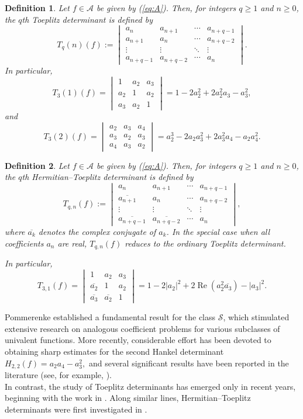 \documentclass[11pt, reqno]{amsart}
\newtheorem{defi}{Definition}[section]
\numberwithin{equation}{section}
\begin{document}
\begin{defi}
Let \(f\in\mathcal{A}\) be given by (\ref{eq:A}). Then, for integers $q\ge1$ and $n\ge0$, the \emph{$q$th Toeplitz determinant} is defined by
\[
T_q(n)(f):=
\begin{vmatrix}
a_n & a_{n+1} & \cdots & a_{n+q-1}\\
a_{n+1} & a_n & \cdots & a_{n+q-2}\\
\vdots & \vdots & \ddots & \vdots\\
a_{n+q-1} & a_{n+q-2} & \cdots & a_n
\end{vmatrix}.
\]
In particular,
\[
T_3(1)(f)
=
\begin{vmatrix}
1 & a_2 & a_3\\
a_2 & 1 & a_2\\
a_3 & a_2 & 1
\end{vmatrix}
=
1-2a_2^2+2a_2^2a_3-a_3^2,
\]
and
\[
T_3(2)(f)
=
\begin{vmatrix}
a_2 & a_3 & a_4\\
a_3 & a_2 & a_3\\
a_4 & a_3 & a_2
\end{vmatrix}
=
a_2^3-2a_2a_3^2+2a_3^2a_4-a_2a_4^2.
\]
\end{defi}

\begin{defi}
Let \(f\in\mathcal{A}\) be given by (\ref{eq:A}). Then, for integers $q\ge1$ and $n\ge0$, the \emph{$q$th Hermitian--Toeplitz determinant} is defined by
\[
T_{q,n}(f):=
\begin{vmatrix}
a_n & a_{n+1} & \cdots & a_{n+q-1}\\
\overline{a_{n+1}} & a_n & \cdots & a_{n+q-2}\\
\vdots & \vdots & \ddots & \vdots\\
\overline{a_{n+q-1}} & \overline{a_{n+q-2}} & \cdots & a_n
\end{vmatrix},
\]
where $\overline{a_k}$ denotes the complex conjugate of $a_k$. In the special case when all coefficients $a_n$ are real, $T_{q,n}(f)$ reduces to the ordinary Toeplitz determinant.

In particular,
\[
T_{3,1}(f)
=
\begin{vmatrix}
1 & a_2 & a_3\\
\overline{a_2} & 1 & a_2\\
\overline{a_3} & \overline{a_2} & 1
\end{vmatrix}
=
1-2|a_2|^2+2\operatorname{Re}(a_2^2\overline{a_3})-|a_3|^2.
\]
\end{defi}

Pommerenke \cite{Pommerenke1966} established a fundamental result for the class $\mathcal{S}$, which stimulated extensive research on analogous coefficient problems for various subclasses of univalent functions. More recently, considerable effort has
been devoted to obtaining sharp estimates for the second Hankel determinant $H_{2,2}(f)=a_2a_4-a_3^2,$ and several significant results have been reported in the literature (see, for example, \cite{CKKLS2018,CKKLS2017,XDL2026,XHX2025}). \\
In contrast, the study of Toeplitz determinants has emerged only in recent years, beginning with the work in \cite{ATA2018}. Along similar lines, Hermitian--Toeplitz determinants were first investigated in \cite{CKLS2020}.
\end{document}
